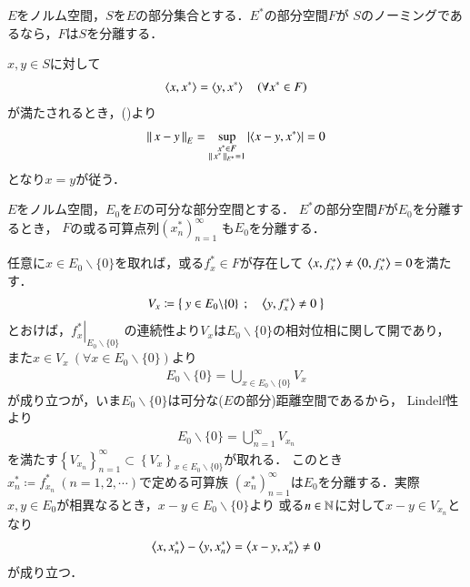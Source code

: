	\begin{screen}
		\begin{thm}[ノーミングは分離する]
			$E$をノルム空間，$S$を$E$の部分集合とする．$E^*$の部分空間$F$が
			$S$のノーミングであるなら，$F$は$S$を分離する．
		\end{thm}
	\end{screen}
	
	\begin{prf}
		$x,y \in S$に対して
		\begin{align}
			\inprod<x,x^*> = \inprod<y,x^*> \quad \left( \forall x^* \in F \right)
		\end{align}
		が満たされるとき，(\refeq{eq:dfn_norming})より
		\begin{align}
			\Norm{x - y}{E} = \sup{\substack{x^* \in F \\ \Norm{x^*}{E^*} = 1}}{\left| \inprod<x-y,x^*> \right|} = 0
		\end{align}
		となり$x = y$が従う．
		\QED
	\end{prf}
	
	\begin{screen}
		\begin{lem}[可分な集合は可算列により分離される]
			$E$をノルム空間，$E_0$を$E$の可分な部分空間とする．
			$E^*$の部分空間$F$が$E_0$を分離するとき，
			$F$の或る可算点列$\left( x^*_n \right)_{n=1}^{\infty}$
			も$E_0$を分離する．
		\end{lem}
	\end{screen}
	
	\begin{prf}
		任意に$x \in E_0 \backslash \{0\}$を取れば，或る$f^*_x \in F$が存在して
		$\inprod<x,f^*_x> \neq \inprod<0,f^*_x> = 0$を満たす．
		\begin{align}
			V_x \coloneqq \Set{y \in E_0 \backslash \{0\}}{\inprod<y,f^*_x> \neq 0}
		\end{align}
		とおけば，$\left. f^*_x \right|_{E_0 \backslash \{0\}}$
		の連続性より$V_x$は$E_0 \backslash \{0\}$の相対位相に関して開であり，
		また$x \in V_x\ (\forall x \in E_0 \backslash \{0\})$より
		\begin{align}
			E_0 \backslash \{0\} = \bigcup_{x \in E_0 \backslash \{0\}} V_x
		\end{align}
		が成り立つが，いま$E_0 \backslash \{0\}$は可分な($E$の部分)距離空間であるから，
		Lindel\Ddot{o}f性より
		\begin{align}
			E_0 \backslash \{0\} = \bigcup_{n=1}^\infty V_{x_n}
		\end{align}
		を満たす$\left\{ V_{x_n} \right\}_{n=1}^{\infty} 
		\subset \left\{ V_x \right\}_{x \in E_0 \backslash \{0\}}$が取れる．
		このとき$x^*_n \coloneqq f^*_{x_n}\ (n=1,2,\cdots)$で定める可算族
		$\left( x^*_n \right)_{n=1}^{\infty}$は$E_0$を分離する．実際
		$x,y \in E_0$が相異なるとき，$x - y \in E_0 \backslash \{0\}$より
		或る$n \in \mathbb{N}$に対して$x - y \in V_{x_n}$となり
		\begin{align}
			\inprod<x,x^*_n> - \inprod<y,x^*_n> = \inprod<x-y,x^*_n> \neq 0
		\end{align}
		が成り立つ．
		\QED
	\end{prf}
	